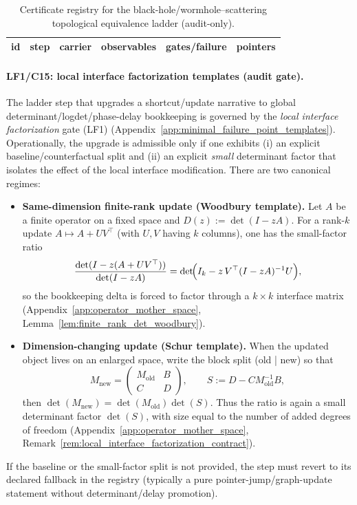 \begin{table}[t]
\centering
\scriptsize
\setlength{\tabcolsep}{6pt}
\renewcommand{\arraystretch}{1.15}
\begin{tabular}{l l l l l l}
\toprule
id & step & carrier & observables & gates/failure & pointers \\
\midrule

\end{tabular}
\caption{Certificate registry for the black-hole/wormhole--scattering topological equivalence ladder (audit-only).}
\label{tab:equivalence_ladder_registry}
\end{table}

%

\paragraph{LF1/C15: local interface factorization templates (audit gate).}
\AuditTag The ladder step that upgrades a shortcut/update narrative to global determinant/logdet/phase-delay bookkeeping is governed by the
\emph{local interface factorization} gate (LF1) (Appendix~\ref{app:minimal_failure_point_templates}).
Operationally, the upgrade is admissible only if one exhibits (i) an explicit baseline/counterfactual split and (ii) an explicit \emph{small} determinant factor
that isolates the effect of the local interface modification.
There are two canonical regimes:
\begin{itemize}
\item \textbf{Same-dimension finite-rank update (Woodbury template).}
Let $A$ be a finite operator on a fixed space and $D(z):=\det(I-zA)$.
For a rank-$k$ update $A\mapsto A+U V^\top$ (with $U,V$ having $k$ columns), one has the small-factor ratio
\[
\frac{\det(I-z(A+UV^\top))}{\det(I-zA)}
=\det\!\Bigl(I_k - z\,V^\top (I-zA)^{-1}U\Bigr),
\]
so the bookkeeping delta is forced to factor through a $k\times k$ interface matrix (Appendix~\ref{app:operator_mother_space},
Lemma~\ref{lem:finite_rank_det_woodbury}).
\item \textbf{Dimension-changing update (Schur template).}
When the updated object lives on an enlarged space, write the block split (old | new) so that
\[
M_{\mathrm{new}}=
\begin{pmatrix}
M_{\mathrm{old}} & B\\
C & D
\end{pmatrix},
\qquad
S:=D-CM_{\mathrm{old}}^{-1}B,
\]
then $\det(M_{\mathrm{new}})=\det(M_{\mathrm{old}})\det(S)$.
Thus the ratio is again a small determinant factor $\det(S)$, with size equal to the number of added degrees of freedom (Appendix~\ref{app:operator_mother_space},
Remark~\ref{rem:local_interface_factorization_contract}).
\end{itemize}
If the baseline or the small-factor split is not provided, the step must revert to its declared fallback in the registry
(typically a pure pointer-jump/graph-update statement without determinant/delay promotion).

